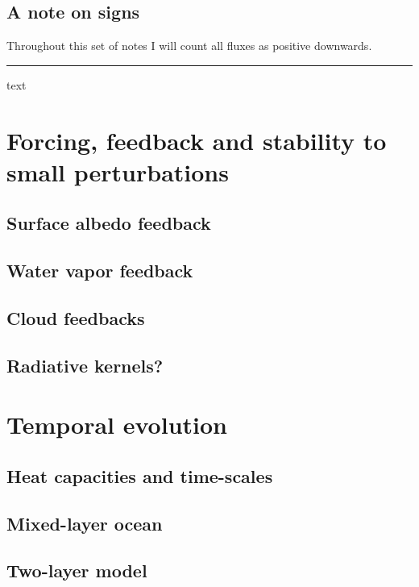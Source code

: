 \documentclass[12pt]{book}
\begin{document}
\section{A note on signs}
Throughout this set of notes I will count all fluxes as positive downwards. 

\vspace{1 cm}
{\setlength{\parindent}{0cm}
\hrule
\begin{exercise}
text
\end{exercise}
}

\chapter{Forcing, feedback and stability to small perturbations}

\section{Surface albedo feedback}
\section{Water vapor feedback}
\section{Cloud feedbacks}
\section{Radiative kernels?}

\chapter{Temporal evolution}
\section{Heat capacities and time-scales}
\section{Mixed-layer ocean}
\section{Two-layer model}
\end{document}

